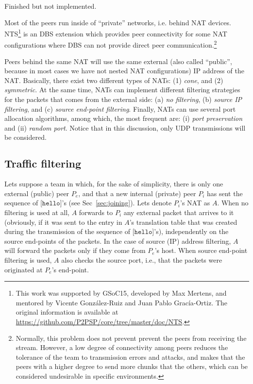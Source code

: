 
\label{sec:NTS}

\begin{note}
  Finished but not implemented.
\end{note}

Most of the peers run inside of ``private'' networks, i.e. behind NAT
devices. NTS\footnote{This work was supported by GSoC15, developed by
Max Mertens, and mentored by Vicente González-Ruiz and Juan Pablo
Gracía-Ortiz. The original information is available
at \url{https://github.com/P2PSP/core/tree/master/doc/NTS}.} is an DBS
extension which provides peer connectivity for some NAT configurations
where DBS can not provide direct peer
communication.\footnote{Normally, this problem does not prevent
prevent the peers from receiving the stream. However, a low degree of
connectivity among peers reduces the tolerance of the team to
transmission errors and attacks, and makes that the peers with a
higher degree to send more chunks that the others, which can be
considered undesirable in specific environments.}

Peers behind the same NAT will use the same external (also called
``public'', because in most cases we have not nested NAT
configurations) IP address of the NAT. Basically, there exist two
different types of NATs: (1) \emph{cone}, and (2) \emph{symmetric}. At
the same time, NATs can implement different filtering strategies for
the packets that comes from the external side: (a) \emph{no
  filtering}, (b) \emph{source IP filtering}, and (c) \emph{source
  end-point filtering}. Finally, NATs can use several port allocation
algorithms, among which, the most frequent are: (i) \emph{port
  preservation} and (ii) \emph{random port}. Notice that in this
discussion, only UDP transmissions will be considered.

\subsection{Traffic filtering}
Lets suppose a team in which, for the sake of simplicity, there is
only one external (public) peer $P_e$, and that a new internal
(private) peer $P_i$ has sent the sequence of [$\mathtt{hello}$]'s
(see Sec~\ref{sec:joining}). Lets denote $P_i$'s NAT as $A$. When no
filtering is used at all, $A$ forwards to $P_i$ any external packet
that arrives to it (obviously, if it was sent to the entry in $A$'s
translation table that was created during the transmission of the
sequence of [$\mathtt{hello}$]'s), independently on the source
end-points of the packets. In the case of source (IP) address
filtering, $A$ will forward the packets only if they come from
$P_e$'s host.  When source end-point filtering is used, $A$ also
checks the source port, i.e., that the packets were originated at
$P_e$'s end-point.

